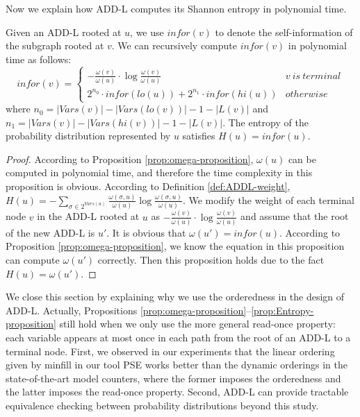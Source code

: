 	Now we explain how ADD-L computes its Shannon entropy in polynomial time.
	\begin{proposition}\label{prop:Entropy-proposition}
		Given an ADD-L rooted at $u$, we use $\mathit{infor}(v)$ to denote the self-information of the subgraph rooted at $v$.
		We can recursively compute $\mathit{infor}(v)$ in polynomial time as follows:
		\begin{equation*}
		\mathit{infor}(v) =  
		\begin{cases}  
			-\frac{\omega(v)}{\omega(u)} \cdot \log \frac{\omega(v)}{\omega(u)} & v \ is \ terminal   \\
			2^{n_0} \cdot \mathit{infor}(lo(u)) + 2^{n_1} \cdot \mathit{infor}(hi(u)) & otherwise
			
			
		\end{cases}  
		\end{equation*}
        where $n_0 = |\mathit{Vars}(v)| - |\mathit{Vars}(lo(v))|-1 - |L(v)|$ and $n_1 = |\mathit{Vars}(v)| - |\mathit{Vars}(hi(v))|-1 - |L(v)|$.  
        The entropy of the probability distribution represented by $u$ satisfies $H(u) = \mathit{infor}(u)$.
		
		
		\begin{proof}
        According to Proposition \ref{prop:omega-proposition}, $\omega(u)$ can be computed in polynomial time, and therefore the time complexity in this proposition is obvious.
		According to Definition \ref{def:ADDL-weight}, $H(u) = -\sum_{\sigma \in 2^{\mathit{Vars}(u)}}\frac{\omega(\sigma,u)}{\omega(u)}\log\frac{\omega(\sigma,u)}{\omega(u)}$.
		We modify the weight of each terminal node $v$ in the ADD-L rooted at $u$ as $-\frac{\omega(v)}{\omega(u)} \cdot \log \frac{\omega(v)}{\omega(u)}$ and assume that the root of the new ADD-L is $u'$.
        It is obvious that $\omega(u') = \mathit{infor}(u)$.
        According to Proposition \ref{prop:omega-proposition}, we know the equation in this proposition can compute $\omega(u')$ correctly.
        Then this proposition holds due to the fact $H(u) = \omega(u')$.
		\end{proof}
		
	\end{proposition}
	
We close this section by explaining why we use the orderedness in the design of ADD-L.
Actually, Propositions \ref{prop:omega-proposition}--\ref{prop:Entropy-proposition} still hold when we only use the more general read-once property: each variable appears at most once in each path from the root of an ADD-L to a terminal node.
First, we observed in our experiments that the linear ordering given by minfill in our tool PSE works better than the dynamic orderings in the state-of-the-art model counters, where the former imposes the orderedness and the latter imposes the read-once property.
Second, ADD-L can provide tractable equivalence checking between probability distributions beyond this study.
